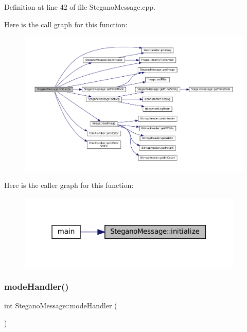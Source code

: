 Definition at line 42 of file Stegano\+Message.\+cpp.

Here is the call graph for this function\+:
\nopagebreak
\begin{figure}[H]
\begin{center}
\leavevmode
\includegraphics[width=350pt]{classSteganoMessage_aeb4d2b69498c148508e2ca70194679cc_cgraph}
\end{center}
\end{figure}
Here is the caller graph for this function\+:
\nopagebreak
\begin{figure}[H]
\begin{center}
\leavevmode
\includegraphics[width=304pt]{classSteganoMessage_aeb4d2b69498c148508e2ca70194679cc_icgraph}
\end{center}
\end{figure}
\mbox{\label{classSteganoMessage_a2649e515941e730520b759282d00dcd6}} 
\subsubsection{\texorpdfstring{modeHandler()}{modeHandler()}}
{\footnotesize\ttfamily int Stegano\+Message\+::mode\+Handler (\begin{DoxyParamCaption}{ }\end{DoxyParamCaption})}




